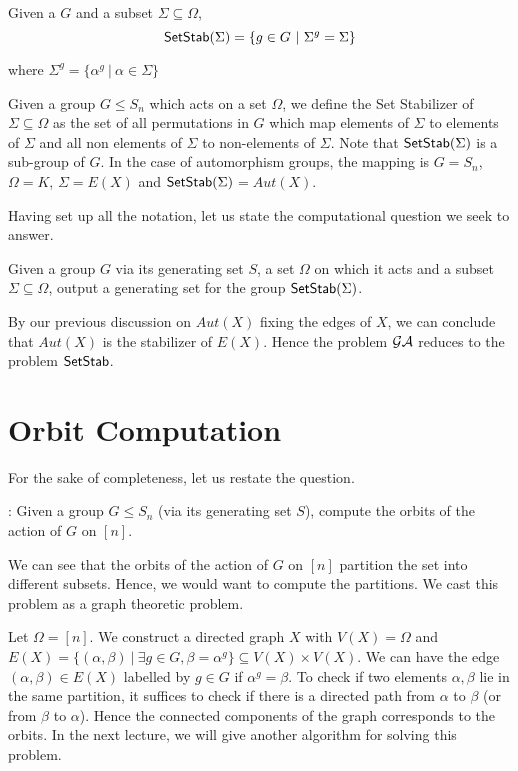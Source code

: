 \begin{definition}
	Given a $G$ and a subset $\Sigma \subseteq \Omega$, 
	\[ 	{\sf SetStab}(\Sigma) = \{ g \in G ~|~ \Sigma^{g} = \Sigma\} \]

	where $\Sigma^g = \{ \alpha^g ~|~ \alpha \in \Sigma \}$
\end{definition}

Given a group $G \le S_n$ which acts on a set $\Omega$, we define the Set
Stabilizer of $\Sigma \subseteq \Omega$ as the set of all permutations in $G$
which map elements of $\Sigma$ to elements of $\Sigma$ and all non elements of
$\Sigma$ to non-elements of $\Sigma$. Note that ${\sf SetStab}(\Sigma)$ is a
sub-group of $G$. In the case of automorphism groups, the mapping is $G =
S_n$, $\Omega = K$, $\Sigma = E(X)$ and
${\sf SetStab}(\Sigma)$$=$$Aut(X)$.

Having set up all the notation, let us state the computational question we
seek to answer.
\begin{problem}
Given a group $G$ via its generating set $S$, a set $\Omega$ on
which it acts and a subset $\Sigma \subseteq \Omega$, output a generating set
for the group ${\sf SetStab}(\Sigma)$.
\end{problem}

By our previous discussion on $Aut(X)$ fixing the edges of $X$, we can
conclude that $Aut(X)$ is the stabilizer of $E(X)$. Hence the problem $\mathcal{GA}$
reduces to the problem ${\sf SetStab}$.

\section{Orbit Computation}
For the sake of completeness, let us restate the question. 

 : Given a group $G \le S_{n}$ (via its generating set
$S$), compute the orbits of the action of $G$ on $[n]$.

We can see that the orbits of the action of $G$ on $[n]$ partition the set
into different subsets. Hence, we would want to compute the partitions. We
cast this problem as a graph theoretic problem.

Let $\Omega = [n]$. We construct a directed graph $X$ with $V(X) = \Omega$ and
$E(X) = \{(\alpha, \beta) ~ | ~ \exists g \in G, \beta = \alpha^g \} \subseteq
V(X) \times V(X)$.  We can have the edge $(\alpha, \beta) \in E(X)$ labelled
by $g \in G$ if $\alpha^g = \beta$. To check if two elements $\alpha, \beta$
lie in the same partition, it suffices to check if there is a directed path
from $\alpha$ to $\beta$ (or from $\beta$ to $\alpha$). Hence the connected
components of the graph corresponds to the orbits. In the next lecture, we
will give another algorithm for solving this problem.


